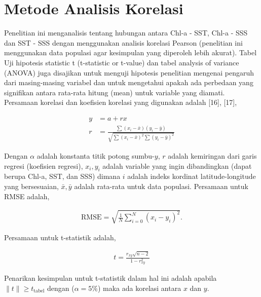 \section[Metode Analisis Korelasi]{Metode Analisis Korelasi}
\begin{spacing}{1.5}
	Penelitian ini menganalisis tentang hubungan antara Chl-a - SST, Chl-a - SSS dan SST - SSS dengan menggunakan analisis korelasi Pearson (penelitian ini menggunakan data populasi agar kesimpulan yang diperoleh lebih akurat). Tabel Uji hipotesis statistic t (t-statistic or t-value) dan tabel analysis of variance (ANOVA) juga disajikan untuk menguji hipotesis penelitian mengenai pengaruh dari masing-masing variabel dan untuk mengetahui apakah ada perbedaan yang signifikan antara rata-rata hitung (mean) untuk variable yang diamati. Persamaan korelasi dan koefisien korelasi yang digunakan adalah [16], [17],
	
	\begin{equation}
		\begin{aligned}
			y &= a+rx\\
			r &= \frac{\sum (x_i - \bar{x})(y_i - \bar{y})}{\sqrt{\sum (x_i-\bar{x})^2\sum (y_i-\bar{y})^2}}
		\end{aligned}
	\end{equation}

	Dengan $\alpha$ adalah konstanta titik potong sumbu-$y$, $r$ adalah kemiringan dari garis regresi (koefisien regresi), $x_i, y_i$ adalah variable yang ingin dibandingkan (dapat berupa Chl-a, SST, dan SSS) dimana $i$ adalah indeks kordinat latitude-longitude yang bersesuaian, $\bar{x},\bar{y}$ adalah rata-rata untuk data populasi. Persamaan untuk RMSE adalah,
	
	\begin{equation}
		\begin{aligned}
			\text{RMSE}=\sqrt{\frac{1}{N}\sum_{i=0}^{N}(x_i-y_i)^2}.
		\end{aligned}
	\end{equation}
	
	Persamaan untuk t-statistik adalah,
	
	\begin{equation}
		\begin{aligned}
			t=\frac{r_{xy}\sqrt{n-2}}{1-r^2_{xy}}
		\end{aligned}
	\end{equation}
	
	Penarikan kesimpulan untuk t-statistik dalam hal ini adalah apabila $\|t\|\geq t_{\text{tabel}}$ dengan ($\alpha=5\%$) maka ada korelasi antara $x$ dan $y$.
\end{spacing}
\vspace{-0.5pc}

